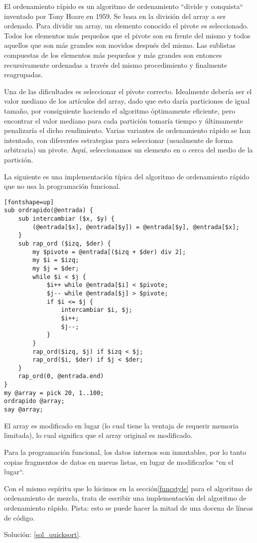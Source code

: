 \begin{exercise}
El ordenamiento rápido es un algoritmo de ordenamiento ``divide y conquista``
inventado por Tony Hoare en 1959. Se basa en la división del array
a ser ordenado. Para dividir un array, un elemento conocido el pivote
es seleccionado. Todos los elementos más pequeños que el pivote son
en frente del mismo y todos aquellos que son más grandes son movidos
después del mismo. Las sublistas compuestas de los elementos más pequeños
y más grandes son entonces recursivamente ordenadas a través del mismo 
procedimiento y finalmente reagrupadas.

Una de las dificultades es seleccionar el pivote correcto. Idealmente
debería ser el valor mediano de los artículos del array, dado que
esto daría particiones de igual tamaño, por consiguiente haciendo el 
algoritmo óptimamente eficiente, pero encontrar el valor mediano 
para cada partición tomaría tiempo y últimamente penalizaría el
dicho rendimiento. Varias variantes de ordenamiento rápido se han 
intentado, con diferentes estrategias para seleccionar (usualmente de
forma arbitraria) un pivote. Aquí, seleccionamos un elemento en o
cerca del medio de la partición.

La siguiente es una implementación típica del algoritmo de 
ordenamiento rápido que no usa la programación funcional.

\begin{verbatim}[fontshape=up]
sub ordrapido(@entrada) {
    sub intercambiar ($x, $y) {
        (@entrada[$x], @entrada[$y]) = @entrada[$y], @entrada[$x];
    }
    sub rap_ord ($izq, $der) {
        my $pivote = @entrada[($izq + $der) div 2];
        my $i = $izq;
        my $j = $der;
        while $i < $j {
            $i++ while @entrada[$i] < $pivote;
            $j-- while @entrada[$j] > $pivote;
            if $i <= $j {
                intercambiar $i, $j;
                $i++;
                $j--;
            }
        }
        rap_ord($izq, $j) if $izq < $j;
        rap_ord($i, $der) if $j < $der;
    }
    rap_ord(0, @entrada.end)
}
my @array = pick 20, 1..100;
ordrapido @array;
say @array;
\end{verbatim}

El array es modificado en lugar (lo cual tiene la ventaja de 
requerir memoria limitada), lo cual significa que el array 
original es modificado.

Para la programación funcional, los datos internos son inmutables, 
por lo tanto copias fragmentos de datos en nuevas listas, en lugar 
de modificarlos ``en el lugar``.

Con el mismo espíritu que lo hicimos en la sección\ref{funcstyle}
para el algoritmo de ordenamiento de mezcla, trata de escribir una
implementación del algoritmo de ordenamiento rápido. Pista: esto 
se puede hacer la mitad de una docena de líneas de código. 

Solución: \ref{sol_quicksort}.

\end{exercise}


